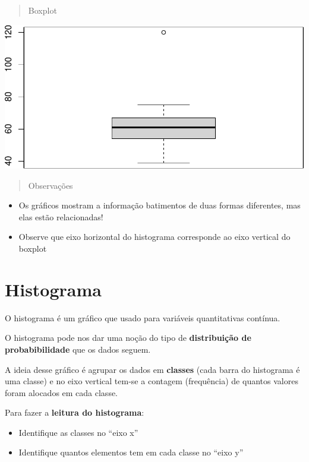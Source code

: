 \documentclass[
]{book}
\begin{document}
\begin{quote}
Boxplot
\end{quote}

\includegraphics{Livro-Estatistica+R_files/figure-latex/unnamed-chunk-15-1.pdf}

\begin{quote}
Observações
\end{quote}

\begin{itemize}
\item
  Os gráficos mostram a informação batimentos de duas formas diferentes, mas elas estão relacionadas!
\item
  Observe que eixo horizontal do histograma corresponde ao eixo vertical do boxplot
\end{itemize}

\section{Histograma}\label{histograma}

O histograma é um gráfico que usado para variáveis quantitativas contínua.

O histograma pode nos dar uma noção do tipo de \textbf{distribuição de probabibilidade} que os dados seguem.

A ideia desse gráfico é agrupar os dados em \textbf{classes} (cada barra do histograma é uma classe) e no eixo vertical tem-se a contagem (frequência) de quantos valores foram alocados em cada classe.

Para fazer a \textbf{leitura do histograma}:

\begin{itemize}
\item
  Identifique as classes no ``eixo x''
\item
  Identifique quantos elementos tem em cada classe no ``eixo y''
\end{itemize}
\end{document}
